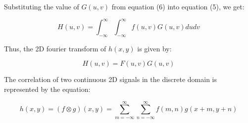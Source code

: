 \documentclass[12pt]{article}
\begin{document}
Substituting the value of $G(u, v)$ from equation (6) into equation (5), we get:

\begin{equation}
    H(u, v) = \int_{-\infty}^{\infty} \int_{-\infty}^{\infty} f(u, v) G(u, v) du dv
\end{equation}

Thus, the 2D fourier transform of $h(x, y)$ is given by:

\begin{equation}
    H(u, v) = F(u, v)G(u, v)
\end{equation}


The correlation of two continuous 2D signals in the discrete domain is represented by the equation:

\begin{equation}
    h(x, y) = (f \otimes g)(x, y) = \sum_{m=-\infty}^{\infty} \sum_{n=-\infty}^{\infty} f(m, n)g(x+m, y+n)
\end{equation}
\end{document}
